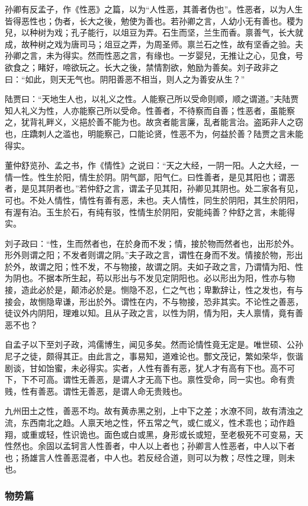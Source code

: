 \documentclass[]{article}
\begin{document}
孙卿有反孟子，作《性恶》之篇，以为``人性恶，其善者伪也''。性恶者，以为人生皆得恶性也；伪者，长大之後，勉使为善也。若孙卿之言，人幼小无有善也。稷为兒，以种树为戏；孔子能行，以俎豆为弄。石生而坚，兰生而香。禀善气，长大就成，故种树之戏为唐司马；俎豆之弄，为周圣师。禀兰石之性，故有坚香之验。夫孙卿之言，未为得实。然而性恶之言，有缘也。一岁婴兒，无推让之心，见食，号欲食之；睹好，啼欲玩之。长大之後，禁情割欲，勉励为善矣。刘子政非之曰：``如此，则天无气也。阴阳善恶不相当，则人之为善安从生？''

陆贾曰：``天地生人也，以礼义之性。人能察己所以受命则顺，顺之谓道。''夫陆贾知人礼义为性，人亦能察己所以受命。性善者，不待察而自善；性恶者，虽能察之，犹背礼畔义，义挹於善不能为也。故贪者能言廉，乱者能言治。盗跖非人之窃也，庄蹻刺人之滥也，明能察己，口能论贤，性恶不为，何益於善？陆贾之言未能得实。

董仲舒览孙、孟之书，作《情性》之说曰：``天之大经，一阴一阳。人之大经，一情一性。性生於阳，情生於阴。阴气鄙，阳气仁。曰性善者，是见其阳也；谓恶者，是见其阴者也。''若仲舒之言，谓孟子见其阳，孙卿见其阴也。处二家各有见，可也。不处人情性，情性有善有恶，未也。夫人情性，同生於阴阳，其生於阴阳，有渥有泊。玉生於石，有纯有驳，性情生於阴阳，安能纯善？仲舒之言，未能得实。

刘子政曰：``性，生而然者也，在於身而不发；情，接於物而然者也，出形於外。形外则谓之阳；不发者则谓之阴。''夫子政之言，谓性在身而不发。情接於物，形出於外，故谓之阳；性不发，不与物接，故谓之阴。夫如子政之言，乃谓情为阳、性为阴也。不据本所生起，苟以形出与不发见定阴阳也。必以形出为阳，性亦与物接，造此必於是，颠沛必於是。恻隐不忍，仁之气也；卑歉辞让，性之发也，有与接会，故恻隐卑谦，形出於外。谓性在内，不与物接，恐非其实。不论性之善恶，徒议外内阴阳，理难以知。且从子政之言，以性为阴，情为阳，夫人禀情，竟有善恶不也？

自孟子以下至刘子政，鸿儒博生，闻见多矣。然而论情性竟无定是。唯世硕、公孙尼子之徒，颇得其正。由此言之，事易知，道难论也。酆文茂记，繁如荣华，恢谐剧谈，甘如饴蜜，未必得实。实者，人性有善有恶，犹人才有高有下也。高不可下，下不可高。谓性无善恶，是谓人才无高下也。禀性受命，同一实也。命有贵贱，性有善恶。谓性无善恶，是谓人命无贵贱也。

九州田土之性，善恶不均。故有黄赤黑之别，上中下之差；水潦不同，故有清浊之流，东西南北之趋。人禀天地之性，怀五常之气，或仁或义，性术乖也；动作趋翔，或重或轻，性识诡也。面色或白或黑，身形或长或短，至老极死不可变易，天性然也。余固以孟轲言人性善者，中人以上者也；孙卿言人性恶者，中人以下者也；扬雄言人性善恶混者，中人也。若反经合道，则可以为教；尽性之理，则未也。

\hypertarget{header-n132}{%
\subsubsection{物势篇}\label{header-n132}}
\end{document}
